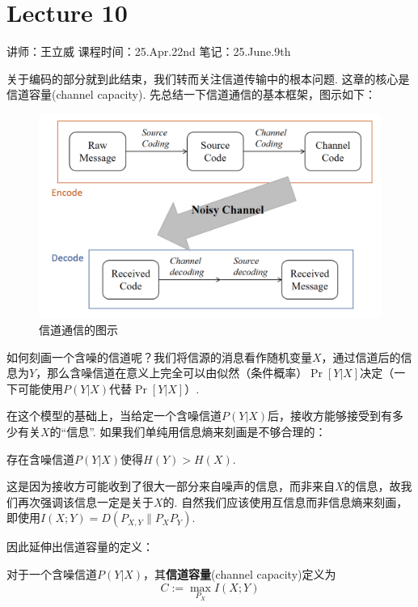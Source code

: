 \chapter{Lecture 10}

\begin{center}
    讲师：王立威 \qquad
    课程时间：25.Apr.22nd\qquad 
    笔记：25.June.9th
\end{center}

\bigskip

关于编码的部分就到此结束，我们转而关注信道传输中的根本问题. 这章的核心是信道容量(channel capacity). 先总结一下信道通信的基本框架，图示如下：
\begin{figure}[H]
    \centering
    \includegraphics[width=.95\textwidth]{images/c10_1.png}
    \caption{信道通信的图示}
\end{figure}

如何刻画一个含噪的信道呢？我们将信源的消息看作随机变量$X$，通过信道后的信息为$Y$，那么含噪信道在意义上完全可以由似然（条件概率）$\Pr[Y|X]$决定（一下可能使用$P(Y|X)$代替$\Pr[Y|X]$）.

在这个模型的基础上，当给定一个含噪信道$P(Y|X)$后，接收方能够接受到有多少有关$X$的“信息”.  如果我们单纯用信息熵来刻画是不够合理的：
\begin{proposition}
    存在含噪信道$P(Y|X)$使得$H(Y) > H(X)$.
\end{proposition}

这是因为接收方可能收到了很大一部分来自噪声的信息，而非来自$X$的信息，故我们再次强调该信息一定是关于$X$的. 自然我们应该使用互信息而非信息熵来刻画，即使用$I(X;Y) = D(P_{X,Y} \| P_X P_Y)$. 

因此延伸出信道容量的定义：
\begin{definition}[信道容量]
    对于一个含噪信道$P(Y|X)$，其\textbf{信道容量}(channel capacity)定义为 
    \[
    C:= \max_{P_X} I(X;Y)
    \]
\end{definition}

